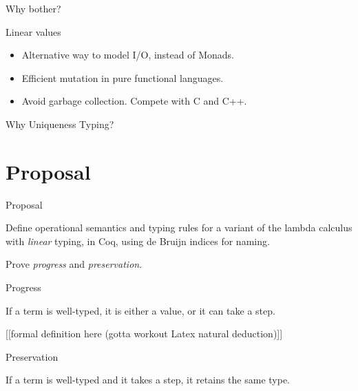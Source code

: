 \documentclass[10pt]{beamer}
\begin{document}
\begin{frame}{Why bother?}

Linear values

\begin{itemize}
\item Alternative way to model I/O, instead of Monads.
\item Efficient mutation in pure functional languages.
\item Avoid garbage collection. Compete with C and C++.
\end{itemize}




\end{frame}

\begin{frame}{Why Uniqueness Typing?}

\end{frame}

\section{Proposal}

\begin{frame}{Proposal}

Define operational semantics and typing rules for a variant of the lambda calculus with \textit{linear} typing, in Coq, using de Bruijn indices for naming.

Prove \textit{progress} and \textit{preservation}.
\end{frame}

\begin{frame}{Progress}

If a term is well-typed, it is either a value, or it can take a step.

[[formal definition here (gotta workout Latex natural deduction)]]
\end{frame}

\begin{frame}{Preservation}

If a term is well-typed and it takes a step, it retains the same type.

\end{frame}
\end{document}
